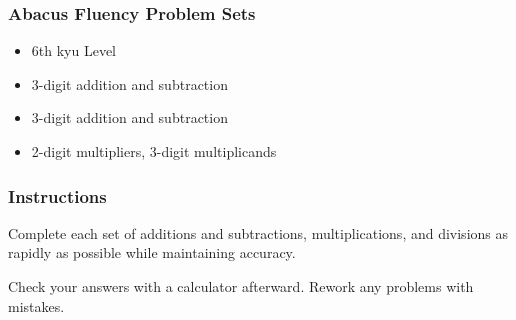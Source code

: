 \hypertarget{abacus-fluency-problem-sets}{%
\subsubsection{Abacus Fluency Problem
Sets}\label{abacus-fluency-problem-sets}}

\begin{itemize}
\item
  6th kyu Level
\item
  3-digit addition and subtraction
\item
  3-digit addition and subtraction
\item
  2-digit multipliers, 3-digit multiplicands
\end{itemize}

\hypertarget{instructions}{%
\subsubsection{Instructions}\label{instructions}}

Complete each set of additions and subtractions, multiplications, and
divisions as rapidly as possible while maintaining accuracy.

Check your answers with a calculator afterward. Rework any problems with
mistakes.
